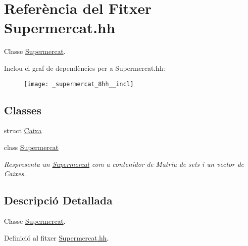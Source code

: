\hypertarget{_supermercat_8hh}{\section{Referència del Fitxer Supermercat.\-hh}
\label{_supermercat_8hh}
}


Classe \hyperlink{class_supermercat}{Supermercat}.  


Inclou el graf de dependències per a Supermercat.\-hh\-:\nopagebreak
\begin{figure}[H]
\begin{center}
\leavevmode
\texttt{[image: \_supermercat\_8hh\_\_incl]}
\end{center}
\end{figure}
\subsection*{Classes}
\begin{DoxyCompactItemize}
\item 
struct \hyperlink{struct_caixa}{Caixa}
\item 
class \hyperlink{class_supermercat}{Supermercat}
\begin{DoxyCompactList}\small\item\em Respresenta un \hyperlink{class_supermercat}{Supermercat} com a contenidor de Matriu de sets i un vector de Caixes. \end{DoxyCompactList}\end{DoxyCompactItemize}


\subsection{Descripció Detallada}
Classe \hyperlink{class_supermercat}{Supermercat}. 

Definició al fitxer \hyperlink{_supermercat_8hh_source}{Supermercat.\-hh}.


